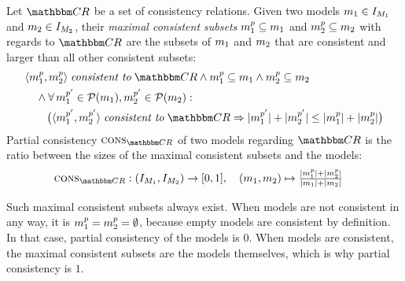 \begin{definition} \label{def:partialconsistency}
    Let $\consistencyrelationset{CR}$ be a set of consistency relations.
    Given two models $\model{m}{1} \in \metamodelinstanceset{M}{1}$ and $\model{m}{2} \in \metamodelinstanceset{M}{2}$, their \emph{maximal consistent subsets} $\model{m}{1}^p \subseteq \model{m}{1}$ and $\model{m}{2}^p \subseteq \model{m}{2}$ with regards to $\consistencyrelationset{CR}$ are the subsets of $\model{m}{1}$ and $\model{m}{2}$ that are consistent and larger than all other consistent subsets:
    \begin{align*}
        & 
        \tupled{\model{m}{1}^p, \model{m}{2}^p} \consistenttomath \consistencyrelationset{CR} \land
        \model{m}{1}^p \subseteq \model{m}{1} \land \model{m}{2}^p \subseteq \model{m}{2}  \\
        & \formulaskip
        \land 
        \forall \model{m}{1}^{p'} \in \mathcal{P}(\model{m}{1}), \model{m}{2}^{p'} \in \mathcal{P}(\model{m}{2}) : \\ %
        & \formulaskip\formulaskip
        \bigl(\tupled{\model{m}{1}^{p'}, \model{m}{2}^{p'}} \consistenttomath \consistencyrelationset{CR}
        \Rightarrow 
        \abs{\model{m}{1}^{p'}} + \abs{\model{m}{2}^{p'}} \leq \abs{\model{m}{1}^{p}} + \abs{\model{m}{2}^{p}} \bigr)
    \end{align*}
    Partial consistency $\function{cons}_{\consistencyrelationset{CR}}$ of two models regarding $\consistencyrelationset{CR}$ is the ratio between the sizes of the maximal consistent subsets and the models:
    \begin{align*}
        \function{cons}_{\consistencyrelationset{CR}}: \; 
        & (\metamodelinstanceset{M}{1}, \metamodelinstanceset{M}{2}) \rightarrow [0,1], \quad
        (\model{m}{1}, \model{m}{2}) \mapsto \tfrac{\abs{\model{m}{1}^{p}} + \abs{\model{m}{2}^{p}}}{\abs{\model{m}{1}} + \abs{\model{m}{2}}}
    \end{align*}
\end{definition}

Such maximal consistent subsets always exist.
When models are not consistent in any way, it is $\model{m}{1}^p = \model{m}{2}^p = \emptyset$, because empty models are consistent by definition.
In that case, partial consistency of the models is $0$.
When models are consistent, the maximal consistent subsets are the models themselves, which is why partial consistency is $1$.

